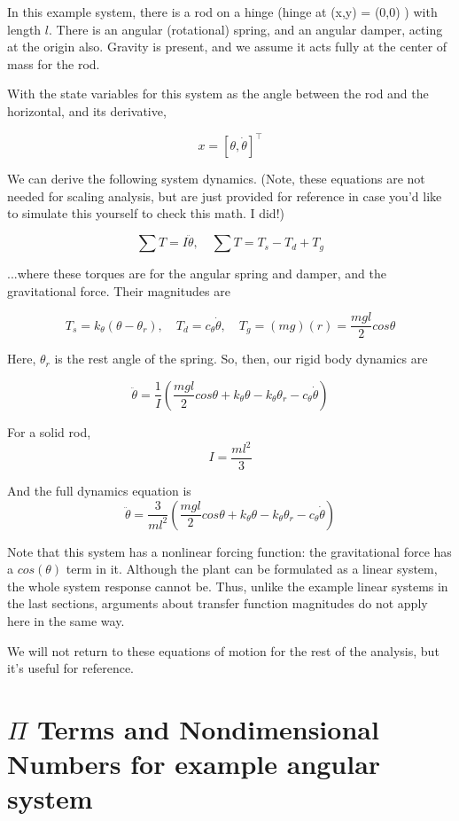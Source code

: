\documentclass[12pt,letterpaper]{article}
\begin{document}
In this example system, there is a rod on a hinge (hinge at (x,y) = (0,0) ) with length $l$.
There is an angular (rotational) spring, and an angular damper, acting at the origin also.
Gravity is present, and we assume it acts fully at the center of mass for the rod.


With the state variables for this system as the angle between the rod and the horizontal, and its derivative,

\[
x = [\theta, \dot \theta]^\top
\]

We can derive the following system dynamics. 
(Note, these equations are not needed for scaling analysis, but are just provided for reference in case you'd like to simulate this yourself to check this math. I did!)

\[
\sum T = I \ddot \theta, \quad \sum T = T_s - T_d + T_g
\]

...where these torques are for the angular spring and damper, and the gravitational force. Their magnitudes are

\[
T_s = k_{\theta}(\theta - \theta_r), \quad T_d = c_{\theta} \dot \theta, \quad T_g = (mg)(r) = \frac{mgl}{2} cos \theta
\]

Here, $\theta_r$ is the rest angle of the spring. So, then, our rigid body dynamics are

\[
\ddot \theta = \frac{1}{I} (\frac{mgl}{2} cos \theta + k_{\theta} \theta - k_{\theta} \theta_r - c_{\theta} \dot \theta )
\]

For a solid rod,
\[
I = \frac{m l^2}{3}
\]


And the full dynamics equation is
\[
\ddot \theta = \frac{3}{m l^2} (\frac{mgl}{2} cos \theta + k_{\theta} \theta - k_{\theta} \theta_r - c_{\theta} \dot \theta )
\]

Note that this system has a nonlinear forcing function: the gravitational force has a $cos(\theta)$ term in it.
Although the plant can be formulated as a linear system, the whole system response cannot be.
Thus, unlike the example linear systems in the last sections, arguments about transfer function magnitudes do not apply here in the same way.

We will not return to these equations of motion for the rest of the analysis, but it's useful for reference.

\section{$\Pi$ Terms and Nondimensional Numbers for example angular system}
\end{document}
